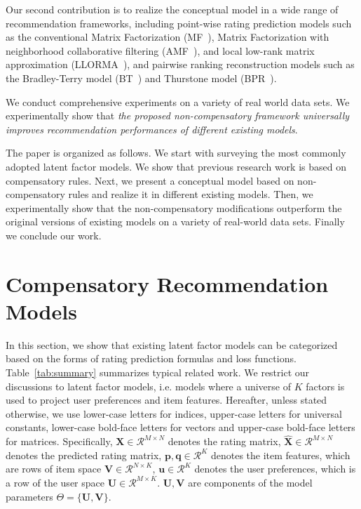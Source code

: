 \documentclass[letterpaper]{article} %
\newcommand{\Real}{\mathcal{R}}
\begin{document}
Our second contribution is to realize the conceptual model in a wide range of recommendation frameworks, including point-wise rating prediction models such as the conventional Matrix Factorization (MF~\cite{Koren2009Matrix}), Matrix Factorization with neighborhood collaborative filtering (AMF~\cite{Koren2008Factorization}), and local low-rank matrix approximation (LLORMA~\cite{Lee2013Local}), and pairwise ranking reconstruction models such as the Bradley-Terry model (BT~\cite{Hu2016Improved}) and Thurstone model (BPR~\cite{Rendle2009BPR}). 

We conduct comprehensive experiments on a variety of real world data sets. We experimentally show that \emph{ the proposed non-compensatory framework universally improves recommendation performances of different existing models}. 

The paper is organized as follows. We start with surveying the most commonly adopted latent factor models. We show that previous research work is based on compensatory rules. Next, we present a conceptual model based on non-compensatory rules and realize it in different existing models. Then, we experimentally show that the non-compensatory modifications outperform the original versions of existing models on a variety of real-world data sets. Finally we conclude our work.

\section{Compensatory Recommendation Models}\label{sec:previousmodel}
In this section, we show that existing latent factor models can be categorized based on the forms of rating prediction formulas and loss functions. Table~\ref{tab:summary} summarizes typical related work. We restrict our discussions to latent factor models, i.e. models where a universe of $K$ factors is used to project  user preferences and item features. Hereafter, unless stated otherwise, we use lower-case letters for indices, upper-case letters for universal constants, lower-case bold-face letters for vectors and upper-case bold-face letters for matrices. Specifically, $\mathbf{X}\in \Real^{M\times N}$ denotes the rating matrix, $\hat{\mathbf{X}}\in \Real^{M\times N}$ denotes the predicted rating matrix,  $\mathbf{p},\mathbf{q}\in \Real^K$ denotes the item features, which are rows of item space $\mathbf{V}\in \Real^{N\times K}$, $\mathbf{u}\in \Real^K$ denotes the user preferences, which is a row of the user space $\mathbf{U}\in \Real^{M\times K}$.  $\mathbf{U},\mathbf{V}$ are components of the model parameters $\Theta=\{\mathbf{U},\mathbf{V} \}$.
\end{document}
